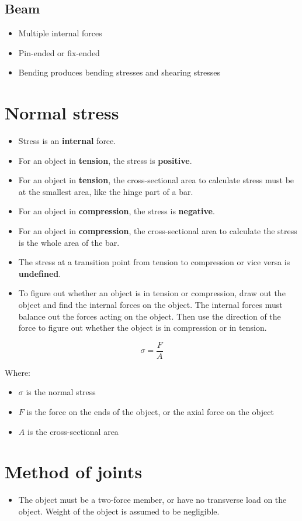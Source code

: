 \documentclass[11pt]{article}
\begin{document}
\subsection{Beam}
\label{sec:org010371a}
\begin{itemize}
\item Multiple internal forces
\item Pin-ended or fix-ended
\item Bending produces bending stresses and shearing stresses
\end{itemize}

\newpage
\section{Normal stress}
\label{sec:org80b935b}
\begin{itemize}
\item Stress is an \textbf{internal} force.
\item For an object in \textbf{tension}, the stress is \textbf{positive}.
\item For an object in \textbf{tension}, the cross-sectional area to calculate stress must be at the smallest area, like the hinge part of a bar.
\item For an object in \textbf{compression}, the stress is \textbf{negative}.
\item For an object in \textbf{compression}, the cross-sectional area to calculate the stress is the whole area of the bar.
\item The stress at a transition point from tension to compression or vice versa is \textbf{undefined}.
\item To figure out whether an object is in tension or compression, draw out the object and find the internal forces on the object. The internal forces must balance out the forces acting on the object. Then use the direction of the force to figure out whether the object is in compression or in tension.
\end{itemize}

\[\sigma = \frac{F}{A}\]

Where:
\begin{itemize}
\item \(\sigma\) is the normal stress
\item \(F\) is the force on the ends of the object, or the axial force on the object
\item \(A\) is the cross-sectional area
\end{itemize}
\section{Method of joints}
\label{sec:org61a8d43}
\begin{itemize}
\item The object must be a two-force member, or have no transverse load on the object. Weight of the object is assumed to be negligible.
\end{itemize}
\end{document}
